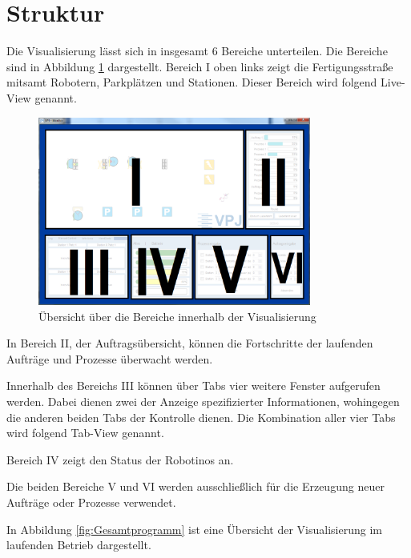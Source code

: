 \section{Struktur}

Die Visualisierung lässt sich in insgesamt 6 Bereiche unterteilen. Die Bereiche sind in Abbildung \ref{fig:GesamtprogrammBereiche} dargestellt. Bereich I oben links zeigt die Fertigungsstraße mitsamt Robotern, Parkplätzen und Stationen. Dieser Bereich wird folgend Live-View genannt. 

\begin{figure}[htb]
    \centering
    \includegraphics[width=0.8\textwidth]{Abbildungen/GesamtprogrammBereiche.png}
    \caption{Übersicht über die Bereiche innerhalb der Visualisierung}		
    \label{fig:GesamtprogrammBereiche}
\end{figure}

In Bereich II, der Auftragsübersicht, können die Fortschritte der laufenden Aufträge und Prozesse überwacht werden.

Innerhalb des Bereichs III können über Tabs vier weitere Fenster aufgerufen werden. Dabei dienen zwei der Anzeige spezifizierter Informationen, wohingegen die anderen beiden Tabs der Kontrolle dienen. Die Kombination aller vier Tabs wird folgend Tab-View genannt.

Bereich IV zeigt den Status der Robotinos an. 

Die beiden Bereiche V und VI werden ausschließlich für die Erzeugung neuer Aufträge oder Prozesse verwendet. 

In Abbildung \ref{fig:Gesamtprogramm} ist eine Übersicht der Visualisierung im laufenden Betrieb dargestellt. 

